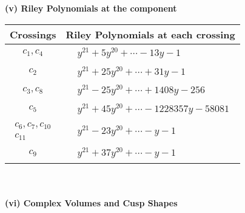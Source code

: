\documentclass[1p]{elsarticle_modified}
\theoremstyle{definition}
\begin{document}
\newpage\renewcommand{\arraystretch}{1}
\flushleft \textbf{(v) Riley Polynomials at the component}\newline \\
\begin{tabular}{m{50pt}|m{274pt}}
Crossings & \hspace{64pt}Riley Polynomials at each crossing \\
\hline $$\begin{aligned}c_{1},c_{4}\end{aligned}$$&$\begin{aligned}
&y^{21}+5 y^{20}+\cdots-13 y-1
\end{aligned}$\\
\hline $$\begin{aligned}c_{2}\end{aligned}$$&$\begin{aligned}
&y^{21}+25 y^{20}+\cdots+31 y-1
\end{aligned}$\\
\hline $$\begin{aligned}c_{3},c_{8}\end{aligned}$$&$\begin{aligned}
&y^{21}-25 y^{20}+\cdots+1408 y-256
\end{aligned}$\\
\hline $$\begin{aligned}c_{5}\end{aligned}$$&$\begin{aligned}
&y^{21}+45 y^{20}+\cdots-1228357 y-58081
\end{aligned}$\\
\hline $$\begin{aligned}c_{6},c_{7},c_{10}\\c_{11}\end{aligned}$$&$\begin{aligned}
&y^{21}-23 y^{20}+\cdots- y-1
\end{aligned}$\\
\hline $$\begin{aligned}c_{9}\end{aligned}$$&$\begin{aligned}
&y^{21}+37 y^{20}+\cdots- y-1
\end{aligned}$\\
\hline
\end{tabular}\\~\\
\newpage\flushleft \textbf{(vi) Complex Volumes and Cusp Shapes}
\end{document}

